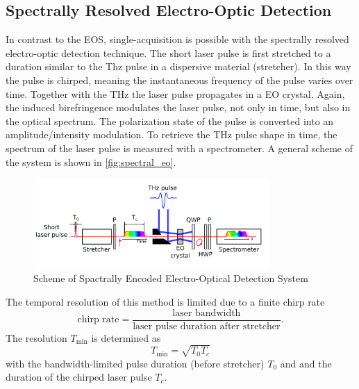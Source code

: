 \subsection{Spectrally Resolved Electro-Optic Detection}
In contrast to the EOS, single-acquisition is possible with the spectrally resolved electro-optic detection technique.
The short laser pulse is first stretched to a duration similar to the Thz pulse in a dispersive material (stretcher). In this way the pulse is chirped, meaning the instantaneous frequency of the pulse varies over time. Together with the THz the laser pulse propagates in a EO crystal. Again, the induced birefringence modulates the laser pulse, not only in time, but also in the optical spectrum. The polarization state of the pulse is converted into an amplitude/intensity modulation. To retrieve the THz pulse shape in time, the spectrum of the laser pulse is measured with a spectrometer. A general scheme of the system is shown in \autoref{fig:spectral_eo}. 
 \cite{roussel2014}
 \begin{figure}[H]
 	\centering
 	\includegraphics[width = 0.8\textwidth]{chap/02-theory/img/spectral_eo}
 	\caption{Scheme of Spactrally Encoded Electro-Optical Detection System \cite{roussel2014}}
 	\label{fig:spectral_eo}
 \end{figure}
The temporal resolution of this method is limited due to a finite chirp rate
\begin{equation}
\text{chirp rate} = \frac{\text{laser bandwidth}}{\text{laser pulse duration after stretcher}}.
\end{equation}
The resolution $T_{\text{min}}$ is determined as
\begin{equation}
T_{\text{min}} = \sqrt{T_0 T_c}
\end{equation}
with the bandwidth-limited pulse duration (before stretcher) $T_0$ and and the duration of the chirped laser pulse $T_c$.

